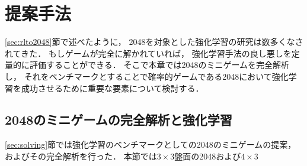 \chapter{提案手法}
\label{chap:proposal}
\ref{sec:rlto2048}節で述べたように， 2048を対象とした強化学習の研究は数多くなされてきた．
もしゲームが完全に解かれていれば， 強化学習手法の良し悪しを定量的に評価することができる．
そこで本章では2048のミニゲームを完全解析し， それをベンチマークとすることで確率的ゲームである2048において強化学習を成功させるために重要な要素について検討する．



\section{2048のミニゲームの完全解析と強化学習}
\ref{sec:solving}節では強化学習のベンチマークとしての2048のミニゲームの提案， およびその完全解析を行った．
本節では$3\times3$盤面の2048および$4\times3$